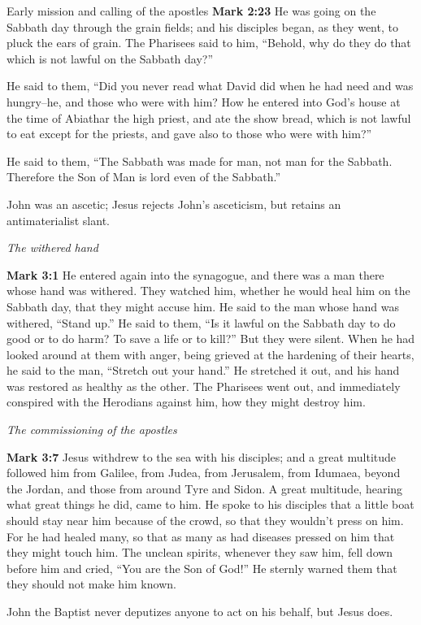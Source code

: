 \documentclass[10pt,twoside]{article} %
\newcommand{\quotesize}{\normalsize{}}
\newcommand{\comm}[1]{\begingroup \color{black!50} #1\endgroup}
\newenvironment{quotetext}{\begingroup\quotesize}{\endgroup}
\newcommand{\bible}[2]{\begin{quotetext}\textbf{#1} #2\end{quotetext}}
\newcommand{\gospelmark}[2]{\bible{Mark #1}{#2}}
\newcommand{\subhead}[1]{\emph{#1}\par}
\begin{document}
\begin{section}{Early mission and calling of the apostles}
\gospelmark{2:23}{He was going on the Sabbath day through the grain fields; and his disciples began, as they went, to pluck the ears of grain.   The Pharisees said to him, ``Behold, why do they do that which is not lawful on the Sabbath day?''

  He said to them, ``Did you never read what David did when he had need and was hungry--he, and those who were with him?    How he entered into God's house at the time of Abiathar the high priest, and ate the show bread, which is not lawful to eat except for the priests, and gave also to those who were with him?''

  He said to them, ``The Sabbath was made for man, not man for the Sabbath.    Therefore the Son of Man is lord even of the Sabbath.'' 
}

\comm{
John was an ascetic;
Jesus rejects John's asceticism, but retains an antimaterialist slant.
}

\subhead{The withered hand}

\gospelmark{3:1}{
He entered again into the synagogue, and there was a man there whose hand was withered.   They watched him, whether he would heal him on the Sabbath day, that they might accuse him.   He said to the man whose hand was withered, ``Stand up.''   He said to them, ``Is it lawful on the Sabbath day to do good or to do harm? To save a life or to kill?'' But they were silent.   When he had looked around at them with anger, being grieved at the hardening of their hearts, he said to the man, ``Stretch out your hand.'' He stretched it out, and his hand was restored as healthy as the other.   The Pharisees went out, and immediately conspired with the Herodians against him, how they might destroy him.}

\subhead{The commissioning of the apostles}

\gospelmark{3:7}{
  Jesus withdrew to the sea with his disciples; and a great multitude followed him from Galilee, from Judea,   from Jerusalem, from Idumaea, beyond the Jordan, and those from around Tyre and Sidon. A great multitude, hearing what great things he did, came to him.   He spoke to his disciples that a little boat should stay near him because of the crowd, so that they wouldn't press on him.   For he had healed many, so that as many as had diseases pressed on him that they might touch him.   The unclean spirits, whenever they saw him, fell down before him and cried, ``You are the Son of God!''   He sternly warned them that they should not make him known.
}

\comm{
John the Baptist never deputizes anyone to act on his behalf, but Jesus does.
}


\end{section}
\end{document}
